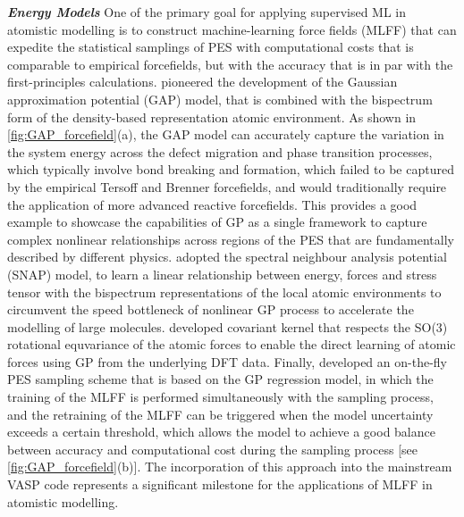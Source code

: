\textbf{\textit{Energy Models}} One of the primary goal for applying supervised ML in atomistic modelling is to construct machine-learning force fields (MLFF) that can expedite the statistical samplings of PES with computational costs that is comparable to empirical forcefields, but with the accuracy that is in par with the first-principles calculations. \citet{bartok2010gaussian} pioneered the development of the Gaussian approximation potential (GAP) model, that is combined with the bispectrum form of the density-based representation atomic environment.\cite{bartok2013representing,willatt2019atom} As shown in \cref{fig:GAP_forcefield}(a), the GAP model can accurately capture the variation in the system energy across the defect migration and phase transition processes, which typically involve bond breaking and formation, which failed to be captured by the empirical Tersoff and Brenner forcefields, and would traditionally require the application of more advanced reactive forcefields. This provides a good example to showcase the capabilities of GP as a single framework to capture complex nonlinear relationships across regions of the PES that are fundamentally described by different physics.  \citet{thompson2015spectral} adopted  the spectral neighbour analysis potential (SNAP) model, to learn a linear relationship between energy, forces and stress tensor with the bispectrum representations of the local atomic environments to circumvent the speed bottleneck of nonlinear GP process to accelerate the modelling of large molecules. \citet{glielmo2017accurate} developed covariant kernel that respects the SO(3) rotational equvariance of the atomic forces to enable the direct learning of atomic forces using GP from the underlying DFT data. Finally, \citet{jinnouchi2019phase} developed an on-the-fly PES sampling scheme that is based on the GP regression model, in which the training of the MLFF is performed simultaneously with the sampling process, and the retraining of the MLFF can be triggered when the model uncertainty exceeds a certain threshold, which allows the model to achieve a good balance between accuracy and computational cost during the sampling process [see \cref{fig:GAP_forcefield}(b)]. The incorporation of this approach into the mainstream VASP code\cite{Kresse1996CMS,Kresse1996PRB,Kresse1999PAW} represents a significant milestone for the applications of MLFF in atomistic modelling.

